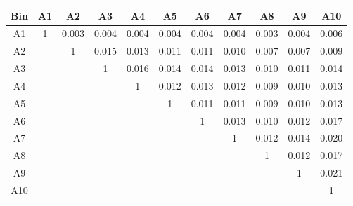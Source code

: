 \begin{tabular}{c@{~~~}c@{~~}c@{~~}c@{~~}c@{~~}c@{~~}c@{~~}c@{~~}c@{~~}c@{~~}c}
\hline 
 \hline 
Bin	& A1 & A2 & A3 & A4 & A5 & A6 & A7 & A8 & A9 & A10 \\ 
\hline 
A1	&  1 &  0.003 &  0.004 &  0.004 &  0.004 &  0.004 &  0.004 &  0.003 &  0.004 &  0.006 \\  
A2	&   &  1 &  0.015 &  0.013 &  0.011 &  0.011 &  0.010 &  0.007 &  0.007 &  0.009 \\  
A3	&   &   &  1 &  0.016 &  0.014 &  0.014 &  0.013 &  0.010 &  0.011 &  0.014 \\  
A4	&   &   &   &  1 &  0.012 &  0.013 &  0.012 &  0.009 &  0.010 &  0.013 \\  
A5	&   &   &   &   &  1 &  0.011 &  0.011 &  0.009 &  0.010 &  0.013 \\  
A6	&   &   &   &   &   &  1 &  0.013 &  0.010 &  0.012 &  0.017 \\  
A7	&   &   &   &   &   &   &  1 &  0.012 &  0.014 &  0.020 \\  
A8	&   &   &   &   &   &   &   &  1 &  0.012 &  0.017 \\  
A9	&   &   &   &   &   &   &   &   &  1 &  0.021 \\  
A10	&   &   &   &   &   &   &   &   &   &  1 \\  
\hline 
 \hline 
\end{tabular}
